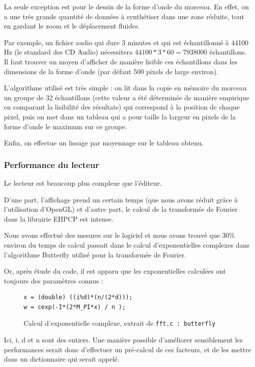 \documentclass[a4paper,11pt]{article}
\begin{document}
La seule exception est pour le dessin de la forme d'onde du morceau. En effet, on a une très grande quantité de données à synthétiser dans
une zone réduite, tout en gardant le zoom et le déplacement fluides.

Par exemple, un fichier audio qui dure 3 minutes et qui est échantillonné à 44100 Hz (le standard des CD Audio)
nécessitera $44100 * 3 * 60 = 7938000$ échantillons. Il faut trouver un moyen d'afficher de manière lisible ces
échantillons dans les dimensions de la forme d'onde (par défaut 500 pixels de large environ).

L'algorithme utilisé est très simple : on lit dans la copie en mémoire du morceau un groupe de 32 échantillons
(cette valeur a été déterminée de manière empirique en comparant la lisibilité des résultats) qui correspond à la position de
chaque pixel, puis on met dans un tableau qui a pour taille la largeur en pixels de la forme d'onde le maximum sur ce groupe.

Enfin, on effectue un lissage par moyennage sur le tableau obtenu.

\subsubsection{Performance du lecteur}
Le lecteur est beaucoup plus complexe que l'éditeur.

D'une part, l'affichage prend un certain temps (que nous avons réduit grâce à l'utilisation d'OpenGL)
et d'autre part, le calcul de la transformée de Fourier dans la librairie EHPCP est intense.

Nous avons effectué des mesures sur le logiciel et nous avons trouvé que 30\% environ du temps de calcul
passait dans le calcul d'exponentielles complexes dans l'algorithme Butterfly utilisé pour la transformée de Fourier.

Or, après étude du code, il est apparu que les exponentielles calculées ont toujours des paramètres connus :
\begin{figure}[H]
\begin{lstlisting}
x = (double) ((i%d)*(n/(2*d)));
w = cexp(-I*(2*M_PI*x) / n );
\end{lstlisting}
\caption{Calcul d'exponentielle complexe, extrait de \texttt{fft.c : butterfly}}
\label{api_cexp}
\end{figure}

Ici, i, d et n sont des entiers. Une manière possible d'améliorer sensiblement les performances serait donc d'effectuer
un pré-calcul de ces facteurs, et de les mettre dans un dictionnaire qui serait appelé.
\end{document}
